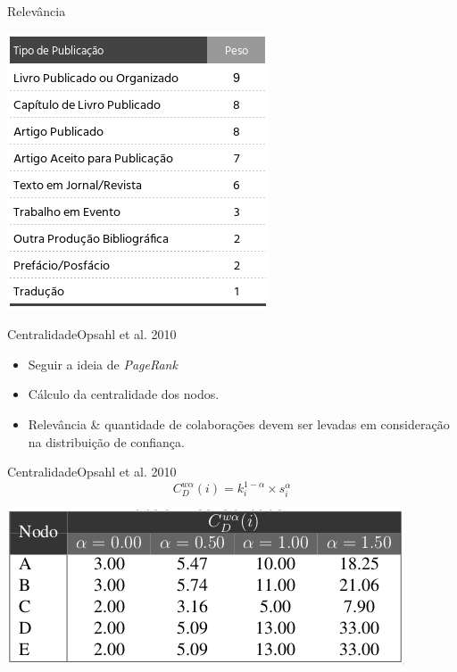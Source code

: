 \documentclass{beamer}
\begin{document}
\begin{frame}{Relevância}{}
  \begin{table}[ht]
    \label{tab:relavancy}
    \includegraphics[width=.5\textwidth]{heuristics.png}
  \end{table}
\end{frame}

\begin{frame}{Centralidade}{Opsahl et al. 2010}
  \begin{itemize}
    \item Seguir a ideia de \textit{PageRank} 
    \item Cálculo da centralidade dos nodos. 
    \item  Relevância \& quantidade de colaborações devem ser levadas em consideração na distribuição de confiança.     
  \end{itemize}
\end{frame}

\begin{frame}{Centralidade}{Opsahl et al. 2010}
  \begin{equation} \label{eqn:centrality} 
    C_D ^{w \alpha} (i) = k_i ^{1 - \alpha} \times s _i ^{\alpha}
  \end{equation}
  \begin{table}[ht]
    \label{tab:centrality}
    \includegraphics[width=.8\textwidth]{centrality.png}
  \end{table}
\end{frame}
\end{document}
